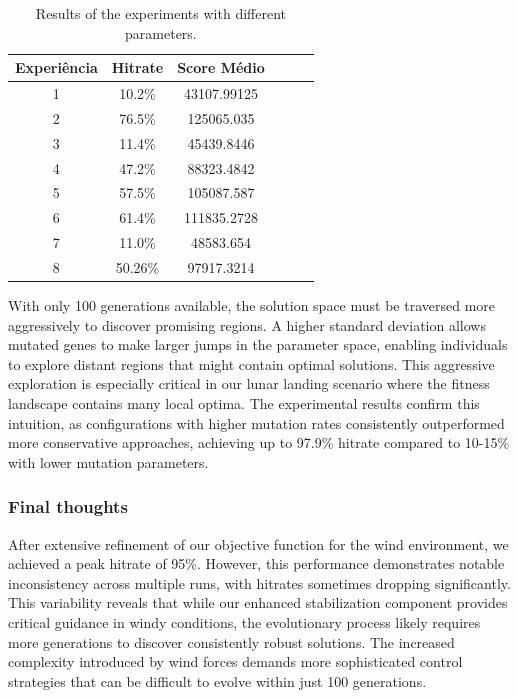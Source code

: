 \documentclass[a4paper, 12pt, fleqn]{report}
\begin{document}
    \begin{table}[H]
        \centering
        \begin{tabular}{|c|c|c|c|c|c|}
        \hline
        \textbf{Experiência} & \textbf{Hitrate} & \textbf{Score Médio} \\
        \hline
                    1 & 10.2\% & 43107.99125  \\
        \hline
                    2 & 76.5\% & 125065.035  \\
        \hline
                    3 & 11.4\% & 45439.8446  \\
        \hline
                    4 & 47.2\% & 88323.4842 \\
        \hline
                    5 & 57.5\% & 105087.587 \\
        \hline
                    6 & 61.4\% &  111835.2728 \\
        \hline
                    7 & 11.0\%  & 48583.654 \\
        \hline
                    8 & 50.26\% &  97917.3214 \\
        \hline
        \end{tabular}
        \caption{Results of the experiments with different parameters.}
        \label{tab:experiments3}
    \end{table}

    \noindent
    With only 100 generations available, the solution space must be traversed more aggressively to discover promising regions. 
    A higher standard deviation allows mutated genes to make larger jumps in the parameter space, enabling individuals to explore distant regions that might contain optimal solutions.
    This aggressive exploration is especially critical in our lunar landing scenario where the fitness landscape contains many local optima. 
    The experimental results confirm this intuition, as configurations with higher mutation rates consistently outperformed more conservative approaches, achieving up to 97.9\% hitrate compared to 10-15\% with lower mutation parameters.


    



    \subsubsection*{Final thoughts}

    After extensive refinement of our objective function for the wind environment, we achieved a peak hitrate of 95\%. However, this performance demonstrates notable inconsistency across multiple runs, with hitrates sometimes dropping significantly. This variability reveals that while our enhanced stabilization component provides critical guidance in windy conditions, the evolutionary process likely requires more generations to discover consistently robust solutions. The increased complexity introduced by wind forces demands more sophisticated control strategies that can be difficult to evolve within just 100 generations.
\end{document}
